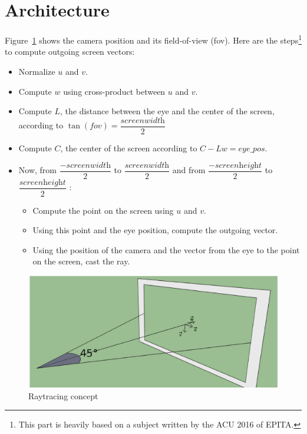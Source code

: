 \documentclass[a4paper,12pt,journal,twoside,compsoc]{PPIEEEtran}
\begin{document}
\section{Architecture}
\label{impl}

 Figure~\ref{Fig:raycast} shows the camera position and its field-of-view (fov).
Here are the steps\footnote{This part is heavily based on a subject written by the ACU 2016 of EPITA.} to compute outgoing screen vectors:
\begin{itemize}
\small
\item Normalize $u$ and $v$.
\item Compute $w$ using cross-product between $u$ and $v$.
\item Compute $L$, the distance between the eye and the center of the screen, according to $\tan(\textit{fov}) = \dfrac{\textit{screenwidth}}{2}$
\item Compute $C$, the center of the screen according to $C - Lw = eye\_pos$.
\item Now, from $\dfrac{-\textit{screenwidth}}{2}$ to $\dfrac{\textit{screenwidth}}{2}$ and from $\dfrac{-\textit{screenheight}}{2}$ to $\dfrac{\textit{screenheight}}{2}$ :
	\begin{itemize}
	\item Compute the point on the screen using $u$ and $v$.
    \item Using this point and the eye position, compute the outgoing vector.
    \item Using the position of the camera and the vector from the eye to the point on the screen, cast the ray.
	\end{itemize}
\end{itemize}

\begin{figure}
\includegraphics[scale=1]{two}
\caption{Raytracing concept}
\label{Fig:raycast}
\end{figure}
\end{document}
